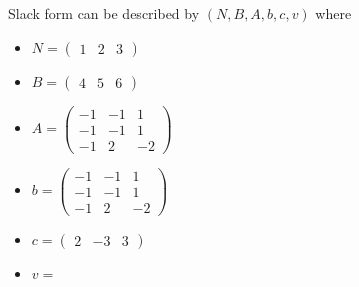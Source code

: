 \begin{enumerate}
        Slack form can be described by $(N, B, A, b, c, v)$ where
        \begin{itemize}
            \item $N = 
                \begin{pmatrix}
                    1 & 2 & 3
                \end{pmatrix} $
            \item $B = 
                \begin{pmatrix}
                    4 & 5 & 6
                \end{pmatrix} $
            \item $A = 
                \begin{pmatrix}
                    -1 & -1 & 1 \\
                    -1 & -1 & 1 \\
                    -1 & 2 & -2 
                \end{pmatrix} $
            \item $b =  
                \begin{pmatrix}
                    -1 & -1 & 1 \\
                    -1 & -1 & 1 \\
                    -1 & 2 & -2 
                \end{pmatrix} $
            \item $c = 
                \begin{pmatrix}
                    2 & -3 & 3
                \end{pmatrix} $
            \item $v =   $
            \end{itemize}
\end{enumerate}

